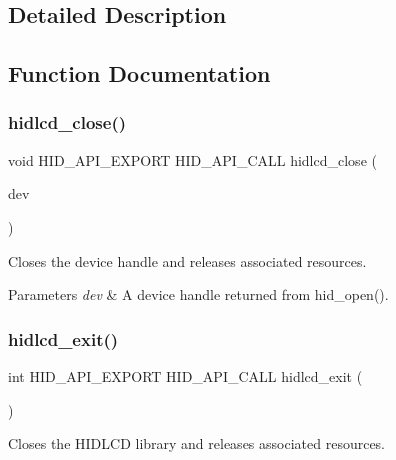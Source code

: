 \subsection{Detailed Description}


\subsection{Function Documentation}
\mbox{\label{group__API_gab5076b4a075677b9298c2261621668bf}} 
\subsubsection{\texorpdfstring{hidlcd\+\_\+close()}{hidlcd\_close()}}
{\footnotesize\ttfamily void H\+I\+D\+\_\+\+A\+P\+I\+\_\+\+E\+X\+P\+O\+RT H\+I\+D\+\_\+\+A\+P\+I\+\_\+\+C\+A\+LL hidlcd\+\_\+close (\begin{DoxyParamCaption}\item[{hid\+\_\+device $\ast$}]{dev }\end{DoxyParamCaption})}



Closes the device handle and releases associated resources. 


\begin{DoxyParams}{Parameters}
{\em dev} & A device handle returned from hid\+\_\+open(). \\
\hline
\end{DoxyParams}
\mbox{\label{group__API_ga67748e0754a894b7d04d9f0beef058fc}} 
\subsubsection{\texorpdfstring{hidlcd\+\_\+exit()}{hidlcd\_exit()}}
{\footnotesize\ttfamily int H\+I\+D\+\_\+\+A\+P\+I\+\_\+\+E\+X\+P\+O\+RT H\+I\+D\+\_\+\+A\+P\+I\+\_\+\+C\+A\+LL hidlcd\+\_\+exit (\begin{DoxyParamCaption}\item[{void}]{ }\end{DoxyParamCaption})}



Closes the H\+I\+D\+L\+CD library and releases associated resources. 


